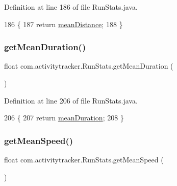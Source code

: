Definition at line 186 of file Run\+Stats.\+java.


\begin{DoxyCode}
186                                    \{
187         \textcolor{keywordflow}{return} \mbox{\hyperlink{classcom_1_1activitytracker_1_1_run_stats_afcc9ab47852b6df6b15e9a592fe6c5ed}{meanDistance}};
188     \}
\end{DoxyCode}
\mbox{\label{classcom_1_1activitytracker_1_1_run_stats_a7d929e97a9d760b4577529bcab71cdf7}} 
\subsubsection{\texorpdfstring{get\+Mean\+Duration()}{getMeanDuration()}}
{\footnotesize\ttfamily float com.\+activitytracker.\+Run\+Stats.\+get\+Mean\+Duration (\begin{DoxyParamCaption}{ }\end{DoxyParamCaption})}



Definition at line 206 of file Run\+Stats.\+java.


\begin{DoxyCode}
206                                    \{
207         \textcolor{keywordflow}{return} \mbox{\hyperlink{classcom_1_1activitytracker_1_1_run_stats_a8bf9f1577cffd26e6235695278bfcdb9}{meanDuration}};
208     \}
\end{DoxyCode}
\mbox{\label{classcom_1_1activitytracker_1_1_run_stats_abb92798a7b1ff95b3b458f9bbd3b2fb8}} 
\subsubsection{\texorpdfstring{get\+Mean\+Speed()}{getMeanSpeed()}}
{\footnotesize\ttfamily float com.\+activitytracker.\+Run\+Stats.\+get\+Mean\+Speed (\begin{DoxyParamCaption}{ }\end{DoxyParamCaption})}



